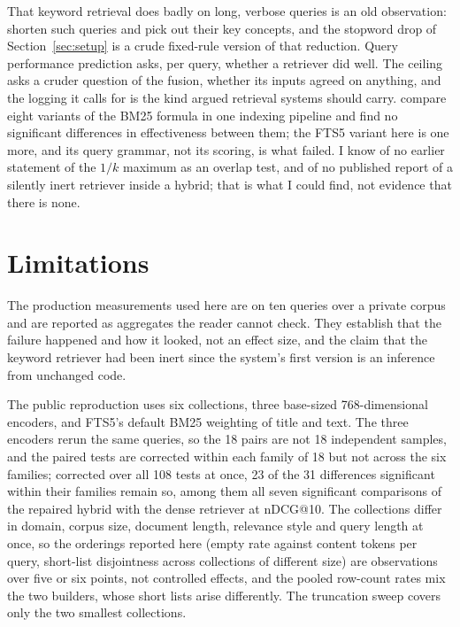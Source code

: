 \documentclass[11pt]{article}
\begin{document}
That keyword retrieval does badly on long, verbose queries is an old observation: \citet{kumaran2007shorter} shorten such queries and \citet{bendersky2008verbose} pick out their key concepts, and the stopword drop of Section~\ref{sec:setup} is a crude fixed-rule version of that reduction. Query performance prediction \citep{cronentownsend2002qpp} asks, per query, whether a retriever did well. The ceiling asks a cruder question of the fusion, whether its inputs agreed on anything, and the logging it calls for is the kind \citet{cooper1998monitoring} argued retrieval systems should carry. \citet{kamphuis2020bm25} compare eight variants of the BM25 formula in one indexing pipeline and find no significant differences in effectiveness between them; the FTS5 variant here is one more, and its query grammar, not its scoring, is what failed. I know of no earlier statement of the $1/k$ maximum as an overlap test, and of no published report of a silently inert retriever inside a hybrid; that is what I could find, not evidence that there is none.

\section{Limitations}
\label{sec:limits}

The production measurements used here are on ten queries over a private corpus and are reported as aggregates the reader cannot check. They establish that the failure happened and how it looked, not an effect size, and the claim that the keyword retriever had been inert since the system's first version is an inference from unchanged code.

The public reproduction uses six collections, three base-sized 768-dimensional encoders, and FTS5's default BM25 weighting of title and text. The three encoders rerun the same queries, so the 18 pairs are not 18 independent samples, and the paired tests are corrected within each family of 18 but not across the six families; corrected over all 108 tests at once, 23 of the 31 differences significant within their families remain so, among them all seven significant comparisons of the repaired hybrid with the dense retriever at nDCG@10. The collections differ in domain, corpus size, document length, relevance style and query length at once, so the orderings reported here (empty rate against content tokens per query, short-list disjointness across collections of different size) are observations over five or six points, not controlled effects, and the pooled row-count rates mix the two builders, whose short lists arise differently. The truncation sweep covers only the two smallest collections.
\end{document}
